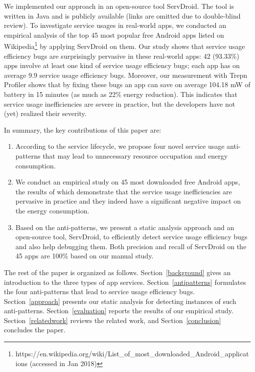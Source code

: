 \documentclass[conference]{IEEEtran}
\begin{document}
We implemented our approach in an open-source tool \textsf{ServDroid}. The tool
is written in Java and is publicly available (links are omitted due to double-blind review).
To investigate service usages in real-world apps, we
conducted an empirical analysis of the top 45 most popular free Android apps
listed on Wikipedia\footnote{https://en.wikipedia.org/wiki/List\_of\_most\_downloaded\_Android\_applications
(accessed in Jan 2018)} by applying \textsf{ServDroid} on them.
Our study shows that
service usage efficiency bugs are surprisingly pervasive in these real-world
apps: 42 (93.33\%) apps involve at least one kind of service usage efficiency
bugs; each app has on average 9.9 service usage efficiency bugs.
Moreover, our measurement with Trepn Profiler shows that by fixing these bugs an
app can save on average 104.18 mW of battery in 15 minutes (as much as 22\%
energy reduction).
This indicates that service usage inefficiencies are
severe in practice, but the developers have not (yet) realized their severity.


In summary, the key contributions of this paper are:
\begin{enumerate}
\item According to the service lifecycle, we propose four novel service usage
anti-patterns that may lead to unnecessary resource occupation and energy
consumption.
\item We conduct an empirical study on 45 most downloaded free Android apps, the
results of which demonstrate that the service usage inefficiencies are pervasive
in practice and they indeed have a significant negative impact on the energy consumption.
\item Based on the anti-patterns, we present a static analysis approach and an
open-source tool, \textsf{ServDroid}, to efficiently detect service usage
efficiency bugs and also help debugging them. Both precision and recall of
\textsf{ServDroid} on the 45 apps are 100\% based on our manual study.
\end{enumerate}

The rest of the paper is organized as follows. Section~\ref{background} gives an
introduction to the three types of app services.
Section~\ref{antipatterns} formulates the four anti-patterns that lead to
service usage efficiency bugs.
Section~\ref{approach} presents our static analysis for detecting instances
of such anti-patterns.
Section~\ref{evaluation} reports the results of our empirical study.
Section~\ref{relatedwork} reviews the related work, and
Section~\ref{conclusion} concludes the paper.
\end{document}
